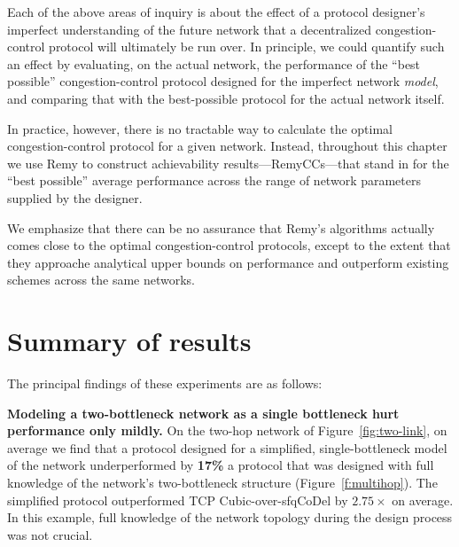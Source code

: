 
Each of the above areas of inquiry is about the effect of a protocol
designer's imperfect understanding of the future network that a
decentralized congestion-control protocol will ultimately be run
over. In principle, we could quantify such an effect by evaluating, on
the actual network, the performance of the ``best possible''
congestion-control protocol designed for the imperfect network
\emph{model}, and comparing that with the best-possible protocol for
the actual network itself.

In practice, however, there is no tractable way to calculate the
optimal congestion-control protocol for a given network. Instead,
throughout this chapter we use Remy to construct achievability
results---RemyCCs---that stand in for the ``best possible'' average
performance across the range of network parameters supplied by the
designer.

We emphasize that there can be no assurance that Remy's algorithms
actually comes close to the optimal congestion-control protocols,
except to the extent that they approache analytical upper bounds on
performance and outperform existing schemes across the same networks.

\section{Summary of results}

The principal findings of these experiments are as follows:

\vspace{\baselineskip}

\noindent 
\textbf{Modeling a two-bottleneck network as a single bottleneck hurt
  performance only mildly.}  On the two-hop network of
Figure~\ref{fig:two-link}, on average we find that a protocol designed
for a simplified, single-bottleneck model of the network
underperformed by {\bf 17\%} a protocol that was designed with full
knowledge of the network's two-bottleneck structure
(Figure~\ref{f:multihop}). The simplified protocol outperformed TCP
Cubic-over-sfqCoDel by $2.75\times$ on average. In this example, full
knowledge of the network topology during the design process was not
crucial.

\vspace{\baselineskip}

